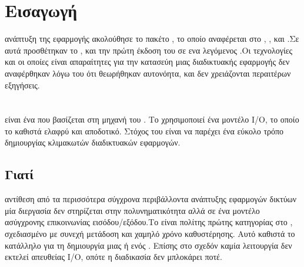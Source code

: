 \section{Εισαγωγή}
 ανάπτυξη της εφαρμογής ακολούθησε το πακέτο , το οποίο αναφέρεται στο , ,  και .Σε αυτά προσθέτηκαν το ,  και την πρώτη έκδοση του  σε ενα  λεγόμενος .Οι τεχνολογίες  και  οι οποίες είναι απαραίτητες για την κατασεύη μιας διαδικτυακής εφαρμογής δεν αναφέρθηκαν λόγω του ότι θεωρήθηκαν αυτονόητα, και δεν χρειάζονται περαιτέρων εξηγήσεις.

\section{}
  είναι ένα  που βασίζεται στη μηχανή  του . Το  χρησιμοποιεί ένα  μοντέλο I/O, το οποίο το καθιστά ελαφρύ και αποδοτικό. Στόχος του  είναι να παρέχει ένα εύκολο τρόπο δημιουργίας κλιμακωτών διαδικτυακών εφαρμογών. 

\subsection*{Γιατί}
 αντίθεση από τα περισσότερα σύγχρονα περιβάλλοντα ανάπτυξης εφαρμογών δικτύων μία διεργασία  δεν στηρίζεται στην πολυνηματικότητα αλλά σε ένα μοντέλο ασύγχρονης επικοινωνίας εισόδου/εξόδου.Το  είναι πολίτης πρώτης κατηγορίας στο , σχεδιασμένο με συνεχή μετάδοση και χαμηλό χρόνο καθυστέρησης. Αυτό καθιστά το  κατάλληλο για τη δημιουργία μιας  ή ενός . Επίσης στο  σχεδόν καμία λειτουργία δεν εκτελεί απευθείας I/O, οπότε η διαδικασία δεν μπλοκάρει ποτέ.

